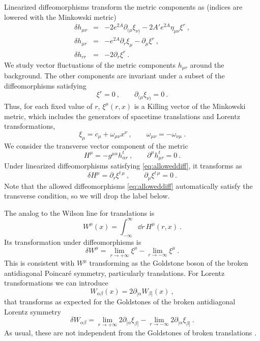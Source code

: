 Linearized diffeomorphisms transform the metric components as (indices are lowered with the Minkowski metric)
\begin{eqnarray}
	\delta h_{\mu\nu}&=&-2e^{2A}\partial_{(\mu}\xi_{\nu)}-2A'e^{2A}\eta_{\mu\nu}\xi^r\ ,\\
	\delta h_{\mu r} &=& -e^{2A}\partial_r \xi_\mu-\partial_\mu \xi^r\ ,\\
	\delta h_{rr} &=& -2\partial_r\xi^r\ .
\end{eqnarray}
We study vector fluctuations of the metric components $h_{\mu r}$ around the background. The other components are invariant under a subset of the diffeomorphisms satisfying
\begin{equation}\label{eq:alloweddiff}
     \xi^r=0
     \ ,\qquad \partial_{(\mu}\xi_{\nu)}=0
     \ .
\end{equation}
Thus, for each fixed value of $r$, $\xi^\mu(r,x)$ is a Killing vector of the Minkowski metric, which includes the generators of spacetime translations and Lorentz transformations,
\begin{equation}
	\xi_\mu=c_\mu+\omega_{\mu\nu} x^\nu
	\ ,\qquad
	\omega_{\mu\nu}=-\omega_{\nu\mu}\ .
\end{equation}
We consider the transverse vector component of the metric 
\begin{equation}
	H^\mu=-g^{\mu\alpha}h_{\alpha r}^t
	\ ,\qquad 
	\partial^\mu h_{\mu r}^t=0\ .
\end{equation}
Under linearized diffeomorphisms satisfying \eqref{eq:alloweddiff}, it transforms as
\begin{equation}
	\delta H^\mu=\partial_r \xi^{t\,\mu}
	\ ,\qquad
	\partial_\mu \xi^{t\,\mu}=0\ . 
\end{equation}
Note that the allowed diffeomorphisms \eqref{eq:alloweddiff} automatically satisfy the transverse condition, so we will drop the label below.

The analog to the Wilson line for translations is
\begin{equation}\label{eq:Wm}
	W^\mu(x)=\int_{-\infty}^\infty \dd r\, H^\mu(r,x)\ .
\end{equation}
Its transformation under diffeomorphisms is 
\begin{equation}
	\delta W^\mu=\lim_{r\to +\infty} \xi^\mu -\lim_{r\to -\infty} \xi^\mu\ .
\end{equation}
This is consistent with $W^\mu$ transforming as the Goldstone boson of the broken antidiagonal Poincar\'e symmetry, particularly translations. For Lorentz transformations we can introduce
\begin{equation}
	W_{\alpha\beta}(x)=2\partial_{[\alpha} W_{\beta]}(x)\ ,
\end{equation}
that transforms as expected for the Goldstones of the broken antidiagonal Lorentz symmetry
\begin{equation}
	\delta W_{\alpha\beta}=\lim_{r\to +\infty} 2\partial_{[\alpha}\xi_{\beta]} -\lim_{r\to -\infty} 2\partial_{[\alpha}\xi_{\beta]}\ .
\end{equation}
As usual, these are not independent from the Goldstones of broken translations \cite{Low:2001bw}.

